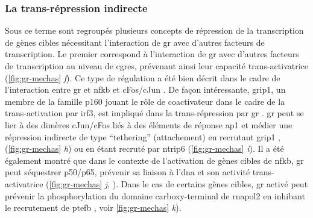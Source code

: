 \documentclass[../main.tex]{subfiles}
\begin{document}
		\subsubsection{La trans-répression indirecte}
			Sous ce terme sont regroupés plusieurs concepts de répression de la transcription de gènes cibles nécessitant l'interaction de \gls{gr} avec d'autres facteurs de transcription.
			Le premier correspond à l'interaction de \gls{gr} avec d'autres facteurs de transcription au niveau de \glspl{cgre}, prévenant ainsi leur capacité trans-activatrice (\autoref{fig:gr-mechas} \textit{f}).
			Ce type de régulation a été bien décrit dans le cadre de l'interaction entre \gls{gr} et \gls{nfkb} \citep{Ray1994} et cFos/cJun \citep{Pearce1993}.
			De façon intéressante, \gls{grip1}, un membre de la famille p160 jouant le rôle de coactivateur dans le cadre de la trans-activation par \gls{irf3}, est impliqué dans la trans-répression par \gls{gr} \citep{Reily2006}.
			\gls{gr} peut se lier à des dimères cJun/cFos liés à des éléments de réponse \gls{ap1} et médier une répression indirecte de type ``tethering'' (attachement) en recrutant \gls{grip1} \citep{Rogatsky2002}, (\autoref{fig:gr-mechas} \textit{h}) ou en étant recruté par \gls{ntrip6} (\autoref{fig:gr-mechas} \textit{i}).
			Il a été également montré que dans le contexte de l'activation de gènes cibles de \gls{nfkb}, \gls{gr} peut séquestrer p50/p65, prévenir sa liaison à l'\gls{dna} et son activité trans-activatrice (\autoref{fig:gr-mechas} \textit{j}, \citet{Mukaida1994,DeBosscher2003}).
			Dans le cas de certains gènes cibles, \gls{gr} activé peut prévenir la phosphorylation du domaine carboxy-terminal de \gls{rnapol2} \citep{Nissen2000} en inhibant le recrutement de \gls{ptefb} \citep{Luecke2005}, voir \autoref{fig:gr-mechas} \textit{k}).
\end{document}
